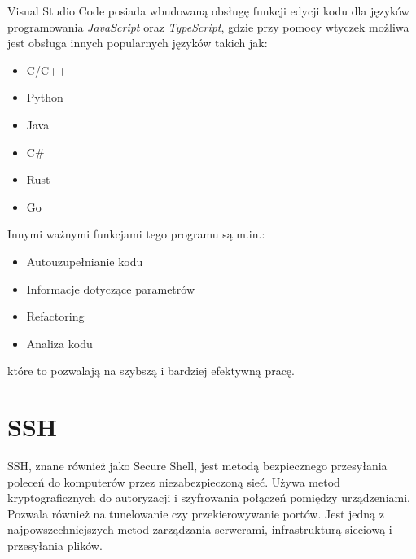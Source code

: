 Visual Studio Code posiada wbudowaną obsługę funkcji edycji kodu dla języków programowania \textit{JavaScript} oraz \textit{TypeScript}, gdzie przy pomocy wtyczek możliwa jest obsługa innych popularnych języków takich jak:

\begin{itemize}
	\item C/C++
	\item Python
	\item Java
	\item C\#
	\item Rust
	\item Go
\end{itemize}

Innymi ważnymi funkcjami tego programu są  m.in.:

\begin{itemize}
	\item Autouzupełnianie kodu
	\item Informacje dotyczące parametrów 
	\item Refactoring
	\item Analiza kodu
\end{itemize}
które to pozwalają na szybszą i bardziej efektywną pracę.

\section{SSH}
SSH, znane również jako Secure Shell, jest metodą bezpiecznego przesyłania poleceń do komputerów przez niezabezpieczoną sieć. Używa metod kryptograficznych do autoryzacji i szyfrowania połączeń pomiędzy urządzeniami. Pozwala również na tunelowanie czy przekierowywanie portów. Jest jedną z najpowszechniejszych metod zarządzania serwerami, infrastrukturą sieciową i przesyłania plików.